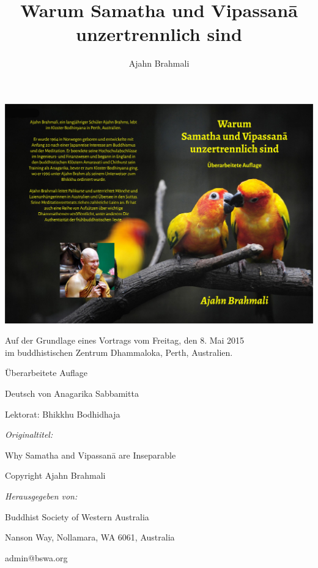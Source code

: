 \documentclass[12pt,openany]{book}
\title{Warum Samatha und Vipassanā \protect\\ unzertrennlich sind}
\author{Ajahn Brahmali}
\date{}
\begin{document}
\frontmatter
\pagestyle{empty}

\hspace*{-156mm}
\includegraphics{sv-2_a5_cover_de-new}

\begin{center}\end{center}
\begin{center}

\vfill

\maketitle

\vfill
\end{center}

\newpage
\restoregeometry

\begin{center}\end{center}

\vspace{4em}
{\small
\noindent Auf der Grundlage eines Vortrags vom Freitag, den 8. Mai 2015 \\im buddhistischen Zentrum Dhammaloka, Perth, Australien.

\medskip

\noindent Überarbeitete Auflage

\medskip

\noindent Deutsch von Anagarika Sabbamitta

\noindent Lektorat: Bhikkhu Bodhidhaja

\medskip

\noindent \emph{Originaltitel:}

\noindent Why Samatha and Vipassanā are Inseparable
\medskip

\noindent Copyright Ajahn Brahmali
\medskip

\noindent \emph{Herausgegeben von:}

\noindent Buddhist Society of Western Australia

 Nanson Way, Nollamara, WA 6061, Australia

\noindent admin@bswa.org



}
\end{document}
